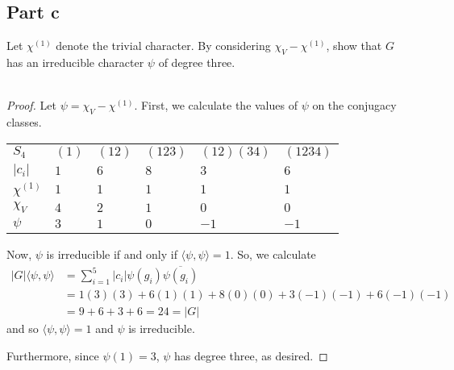 \documentclass[12pt,reqno]{amsart}
\begin{document}
\subsection*{Part c}
Let $\chi^{(1)}$ denote the trivial character. By considering
$\chi_V-\chi^{(1)}$, show that $G$ has an irreducible character $\psi$ of degree
three.
\\
\\
\begin{proof}
    Let $\psi = \chi_V-\chi^{(1)}$. First, we calculate the values of $\psi$ on
    the conjugacy classes.
    \begin{center}
        \begin{tabular}{l| l l l l l}
            $S_4$       & $(1)$ & $(12)$ & $(123)$ & $(12)(34)$ & $(1234)$\\
            $|c_i|$     & $1$   & $6$    & $8$     & $3$        & $6$\\
            \hline
            $\chi^{(1)}$& $1$   & $1$    & $1$     & $1$        & $1$\\
            $\chi_V$    & $4$   & $2$    & $1$     & $0$        & $0$\\
            $\psi$      & $3$   & $1$    & $0$     & $-1$       & $-1$\\
        \end{tabular}
    \end{center}

    Now, $\psi$ is irreducible if and only if $\langle \psi,\psi\rangle  =1$.
    So, we calculate
    \[
        \begin{aligned}
            |G|\langle \psi, \psi\rangle &=
            \sum_{i=1}^5|c_i|\psi(g_i)\overline{\psi(g_i)}\\
            &= 1(3)(3) + 6(1)(1) + 8(0)(0) + 3(-1)(-1) + 6(-1)(-1)\\
            &= 9 + 6 + 3 + 6 = 24 = |G|
        \end{aligned}
    \]
    and so $\langle \psi,\psi\rangle = 1$ and $\psi$ is irreducible.

    Furthermore, since $\psi(1) = 3$, $\psi$ has degree three, as desired.
\end{proof}
\end{document}
